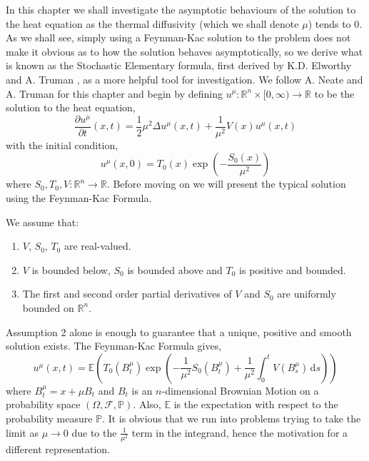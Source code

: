 \documentclass[a4paper,12pt,draft]{report}
\theoremstyle{remark}
\theoremstyle{definition}
\begin{document}
In this chapter we shall investigate the asymptotic behaviours of the solution to the heat equation as the thermal diffusivity (which we shall denote $\mu$) tends to $0$.  As we shall see, simply using a Feynman-Kac solution to the problem does not make it obvious as to how the solution behaves asymptotically, so we derive what is known as the Stochastic Elementary formula, first derived by K.D. Elworthy and A. Truman \cite{SEF4}, as a more helpful tool for investigation.  We follow A. Neate and A. Truman \cite{ANAT} for this chapter and begin by defining $u^{\mu} : \mathbb{R}^n \times [0, \infty) \to \mathbb{R}$ to be the solution to the heat equation,
\begin{equation}
\frac{\partial u^{\mu}}{\partial t}(x, t) = \frac{1}{2}\mu^2\Delta u^{\mu}(x, t) + \frac{1}{\mu^2}V(x)u^{\mu}(x, t) \label{HE}
\end{equation}
with the initial condition,
$$
u^{\mu}(x, 0) = T_{0}(x)\exp\left(-\frac{S_{0}(x)}{\mu^2}\right)
$$
where $S_{0}, T_{0}, V:\mathbb{R}^n \to \mathbb{R}$.
Before moving on we will present the typical solution using the Feynman-Kac Formula.

\assume
{
We assume that:
\begin{enumerate}
\item $V$, $S_0$, $T_0$ are real-valued.
\item $V$ is bounded below, $S_0$ is bounded above and $T_0$ is positive and bounded.
\item The first and second order partial derivatives of $V$ and $S_0$ are uniformly bounded on $\mathbb{R}^n$.
\end{enumerate}
}

Assumption 2 alone is enough to guarantee that a unique, positive and smooth solution exists.  The Feynman-Kac Formula gives,
$$
u^{\mu}(x, t) = \mathbb{E}\left(T_{0}(B^{\mu}_t)\exp\left(-\frac{1}{\mu^2}S_{0}(B^{\mu}_t) + \frac{1}{\mu^2}\int_{0}^{t}V(B^{\mu}_s)\,\mathrm{d}s\right)\right)
$$
where $B^{\mu}_t = x + \mu B_{t}$ and $B_{t}$ is an $n$-dimensional Brownian Motion on a probability space $(\Omega, \mathscr{F}, \mathbb{P})$.  Also, $\mathbb{E}$ is the expectation with respect to the probability measure $\mathbb{P}$.  It is obvious that we run into problems trying to take the limit as $\mu \to 0$ due to the $\frac{1}{\mu^2}$ term in the integrand, hence the motivation for a different representation.
\end{document}
